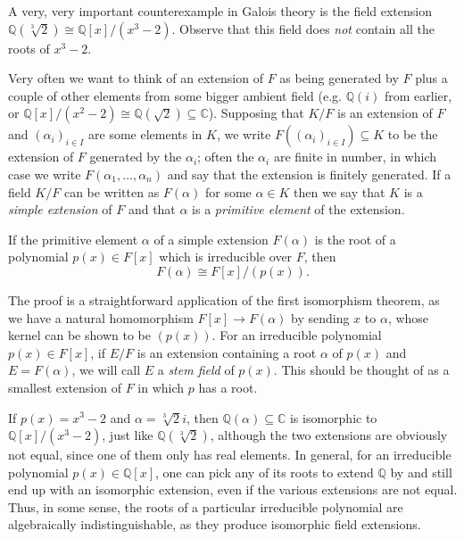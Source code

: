 \documentclass[10pt]{article}
\providecommand{\CC}{\mathbb C}
\providecommand{\QQ}{\mathbb Q}
\providecommand{\vocab}[1]{{{\sffamily\textit{#1}}}}
\begin{document}
\begin{example}
    \label{ex:Q-cbrt-3}
    A very, very important counterexample in Galois theory
    is the field extension $\QQ(\sqrt[3]2) \cong \QQ[x]/(x^3 - 2)$.
    Observe that this field does \emph{not} contain
    all the roots of $x^3 - 2$.
\end{example}

Very often we want to think of an extension of $F$
as being generated by $F$ plus a couple of other elements
from some bigger ambient field (e.g. $\QQ(i)$ from earlier,
or $\QQ[x]/(x^2 - 2)\cong \QQ(\sqrt 2)\subseteq\CC$).
Supposing that $K/F$ is an extension of $F$
and $(\alpha_i)_{i\in I}$ are some elements in $K$,
we write $F((\alpha_i)_{i\in I})\subseteq K$ to be the extension of $F$
generated by the $\alpha_i$; often the $\alpha_i$ are finite in number,
in which case we write $F(\alpha_1,\dots,\alpha_n)$
and say that the extension is finitely generated.
If a field $K/F$ can be written as $F(\alpha)$ for some $\alpha\in K$
then we say that $K$ is a \vocab{simple extension} of $F$
and that $\alpha$ is a \vocab{primitive element} of the extension.

\begin{prop}
    \label{prop:simple-extension-quotient-poly}
    If the primitive element $\alpha$ of a simple extension $F(\alpha)$
    is the root of a polynomial $p(x)\in F[x]$
    which is irreducible over $F$, then
    \begin{equation*}
	F(\alpha)\cong F[x]/(p(x)).
    \end{equation*}
\end{prop}

The proof is a straightforward application of the first isomorphism theorem,
as we have a natural homomorphism $F[x]\to F(\alpha)$
by sending $x$ to $\alpha$, whose kernel can be shown to be $(p(x))$.
For an irreducible polynomial $p(x)\in F[x]$,
if $E/F$ is an extension containing a root $\alpha$ of $p(x)$
and $E = F(\alpha)$, we will call $E$ a \vocab{stem field} of $p(x)$.
This should be thought of as a smallest extension of $F$
in which $p$ has a root.

\begin{example}
    \label{ex:complex-cbrt-3}
    If $p(x) = x^3 - 2$ and
    $\alpha = \sqrt[3]2i$, then $\QQ(\alpha)\subseteq\CC$
    is isomorphic to $\QQ[x]/(x^3 - 2)$,
    just like $\QQ(\sqrt[3]2)$,
    although the two extensions are obviously not equal,
    since one of them only has real elements. In general,
    for an irreducible polynomial $p(x)\in\QQ[x]$,
    one can pick any of its roots to extend $\QQ$ by
    and still end up with an isomorphic extension,
    even if the various extensions are not equal.
    Thus, in some sense, the roots of a particular irreducible polynomial
    are algebraically indistinguishable, as they produce isomorphic
    field extensions.
\end{example}
\end{document}
